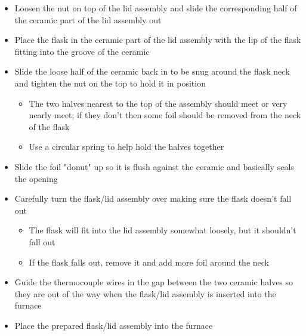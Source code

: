 \documentclass[letterpaper,11pt]{article}
\begin{document}
\begin{itemize}
\begin{itemize}
        \item Loosen the nut on top of the lid assembly and slide the 
            corresponding half of the ceramic part of the lid assembly out
        \item Place the flask in the ceramic part of the lid assembly with the 
            lip of the flask fitting into the groove of the ceramic
        \item Slide the loose half of the ceramic back in to be snug 
            around the flask neck and tighten the nut on the top to hold it
            in position
                
                \begin{itemize}
                \item The two halves nearest to the top of the assembly should 
                    meet or very nearly meet; if they don't then some 
                    foil should be removed from the neck of the flask
                \item Use a circular spring to help hold the halves together
                \end{itemize}
                
        \item Slide the foil "donut" up so it is flush against the ceramic and 
            basically seals the opening
        \item Carefully turn the flask/lid assembly over making sure the flask 
            doesn't fall out
            
                \begin{itemize}
                \item The flask will fit into the lid assembly somewhat loosely, 
                    but it shouldn't fall out
                \item If the flask falls out, remove it and add more foil 
                around the neck
                \end{itemize}
                
        \item Guide the thermocouple wires in the gap between the two ceramic 
            halves so they are out of the way when the flask/lid assembly is 
            inserted into the furnace
        \item Place the prepared flask/lid assembly into the furnace
        \end{itemize}
        
    \pagebreak    
    

\end{itemize}
\end{document}
